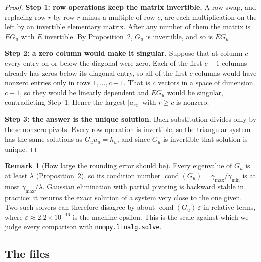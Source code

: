 \documentclass[11pt]{article}
\theoremstyle{definition}
\newtheorem{remark}[proposition]{Remark}
\newcommand{\code}[1]{\texttt{#1}}
\begin{document}
\begin{proof}
\textbf{Step 1: row operations keep the matrix invertible.} A row swap, and replacing row $r$ by
row $r$ minus a multiple of row $c$, are each multiplication on the left by an invertible
elementary matrix. After any number of them the matrix is $EG_u$ with $E$ invertible. By
Proposition~2, $G_u$ is invertible, and so is $EG_u$.

\textbf{Step 2: a zero column would make it singular.} Suppose that at column $c$ every entry on or
below the diagonal were zero. Each of the first $c - 1$ columns already has zeros below its
diagonal entry, so all of the first $c$ columns would have nonzero entries only in rows
$1, \dots, c-1$. That is $c$ vectors in a space of dimension $c - 1$, so they would be linearly
dependent and $EG_u$ would be singular, contradicting Step~1. Hence the largest $|a_{rc}|$ with
$r \ge c$ is nonzero.

\textbf{Step 3: the answer is the unique solution.} Back substitution divides only by these
nonzero pivots. Every row operation is invertible, so the triangular system has the same
solutions as $G_u u_u = h_u$, and since $G_u$ is invertible that solution is unique.
\end{proof}

\begin{remark}[How large the rounding error should be]
\label{rem:rounding}
Every eigenvalue of $G_u$ is at least $\lambda$ (Proposition~2), so its condition number
$\operatorname{cond}(G_u) = \gamma_{\max}/\gamma_{\min}$ is at most $\gamma_{\max}/\lambda$.
Gaussian elimination with partial pivoting is backward stable in practice: it returns the exact
solution of a system very close to the one given. Two such solvers can therefore disagree by about
$\operatorname{cond}(G_u)\,\varepsilon$ in relative terms, where
$\varepsilon \approx 2.2\times 10^{-16}$ is the machine epsilon. This is the scale against which
we judge every comparison with \code{numpy.linalg.solve}.
\end{remark}

\subsection{The files}
\end{document}
